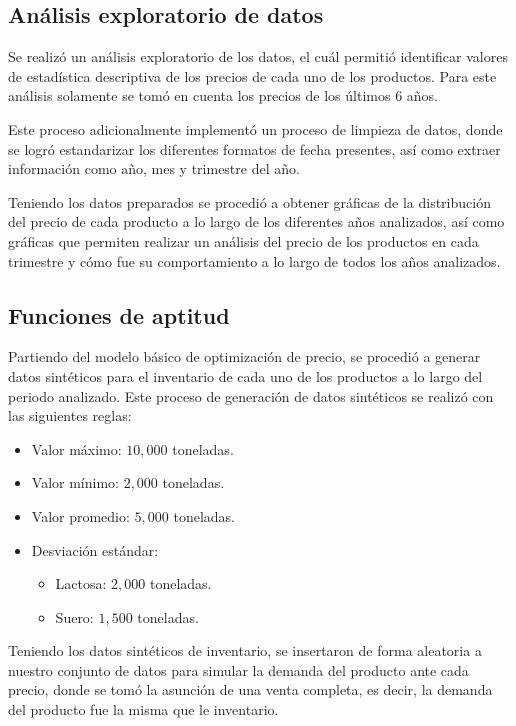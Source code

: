 \subsection{Análisis exploratorio de datos}
Se realizó un análisis exploratorio de los datos, el cuál permitió identificar valores de estadística descriptiva de los precios de cada uno de los productos. Para este análisis solamente se tomó en cuenta los precios de los últimos 6 años.

Este proceso adicionalmente implementó un proceso de limpieza de datos, donde se logró estandarizar los diferentes formatos de fecha presentes, así como extraer información como año, mes y trimestre del año.

Teniendo los datos preparados se procedió a obtener gráficas de la distribución del precio de cada producto a lo largo de los diferentes años analizados, así como gráficas que permiten realizar un análisis del precio de los productos en cada trimestre y cómo fue su comportamiento a lo largo de todos los años analizados.


\subsection{Funciones de aptitud}
Partiendo del modelo básico de optimización de precio, se procedió a generar datos sintéticos para el inventario de cada uno de los productos a lo largo del periodo analizado. Este proceso de generación de datos sintéticos se realizó con las siguientes reglas:

\begin{itemize}
	\item Valor máximo: $10,000$ toneladas.
	\item Valor mínimo: $2,000$ toneladas.
	\item Valor promedio: $5,000$ toneladas.
	\item Desviación estándar:
	\begin{itemize}
		\item Lactosa: $2,000$ toneladas.
		\item Suero: $1,500$ toneladas.
	\end{itemize}
\end{itemize}

Teniendo los datos sintéticos de inventario, se insertaron de forma aleatoria a nuestro conjunto de datos para simular la demanda del producto ante cada precio, donde se tomó la asunción de una venta completa, es decir, la demanda del producto fue la misma que le inventario.

